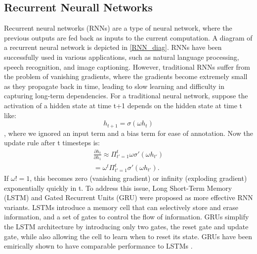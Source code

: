 \subsection{Recurrent Neurall Networks}
\label{POMDP_RNN}
Recurrent neural networks (RNNs) are a type of neural network, where the previous outputs are fed back as inputs to the current computation. A diagram of a 
recurrent neural network is depicted in \ref{RNN_diag}.
RNNs have been successfully used in various applications, such as natural language processing, speech recognition, and image captioning. 
However, traditional RNNs suffer from the problem of vanishing gradients, where the gradients become extremely small as they propagate back in time, 
leading to slow learning and difficulty in capturing long-term dependencies.
For a traditional neural network, suppose the activation of a hidden state at time t+1 depends on the hidden state at time t like:
\begin{equation}
    h_{t+1} = \sigma(\omega h_t)
\end{equation}
, where we ignored an input term and a bias term for ease of annotation. Now the update rule after t timesteps is:
\begin{align*}
        \frac{\partial h_t}{\partial h_1} \approx \Pi_{t'=1}^t \omega \sigma'(\omega h_{t'}) \\
        = \omega^{t} \Pi_{t'=1}^t \sigma'(\omega h_{t'}).
\end{align*}
If $\omega != 1$, this becomes zero (vanishing gradient) or infinity (exploding gradient) exponentially quickly in t.
To address this issue, Long Short-Term Memory (LSTM) and Gated Recurrent Units (GRU) were proposed as more effective RNN variants. 
LSTMs introduce a memory cell that can selectively store and erase information, and a set of gates to control the flow of information. 
GRUs simplify the LSTM architecture by introducing only two gates, the reset gate and update gate, while also allowing the cell to learn when to reset its state. 
GRUs have been emirically shown to have comparable performance to LSTMs \cite{https://arxiv.org/pdf/2107.02248.pdf}.

